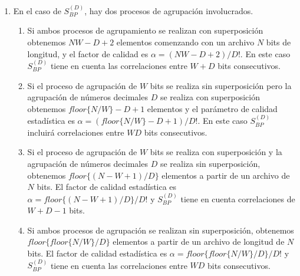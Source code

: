 \begin{enumerate}
	\item En el caso de $S^{(D)}_{BP} $, hay dos procesos de agrupación involucrados.
	\begin{enumerate}
		\item Si ambos procesos de agrupamiento se realizan con superposición obtenemos $NW-D + 2$ elementos comenzando con un archivo $ N $ bits de longitud, y el factor de calidad es $\alpha = (NW-D + 2) / D!$.
		En este caso $S ^ {(D)}_{BP}$ tiene en cuenta las correlaciones entre $W + D$ bits consecutivos.
		\item Si el proceso de agrupación de $W$ bits se realiza sin superposición pero la agrupación de números decimales $D$ se realiza con superposición obtenemos $floor\{N/W\}-D+1$ elementos y el parámetro de calidad estadística es $\alpha=(floor\{N/W\}-D+1)/D!$.
		En este caso $S^{(D)}_{BP}$ incluirá correlaciones entre $WD$ bits consecutivos.
		\item Si el proceso de agrupación de $W$ bits se realiza con superposición y la agrupación de números decimales $D$ se realiza sin superposición, obtenemos $floor\{(N-W+1)/D\}$ elementos a partir de un archivo de $N$ bits.
		El factor de calidad estadística es $\alpha=floor\{(N-W+1)/D\}/D!$ y $S^{(D)}_{BP}$ tiene en cuenta correlaciones de $W+D-1$ bits.
		\item Si ambos procesos de agrupación se realizan sin superposición, obtenemos $floor\{floor\{N/W\}/D\}$ elementos a partir de un archivo de longitud de  $N$ bits.
		El factor de calidad estadística es $\alpha=floor\{floor\{N/W\}/D\}/D!$ y $S^{(D)}_{BP}$ tiene en cuenta las correlaciones entre $WD$ bits consecutivos.
	\end{enumerate}
\end{enumerate} 

